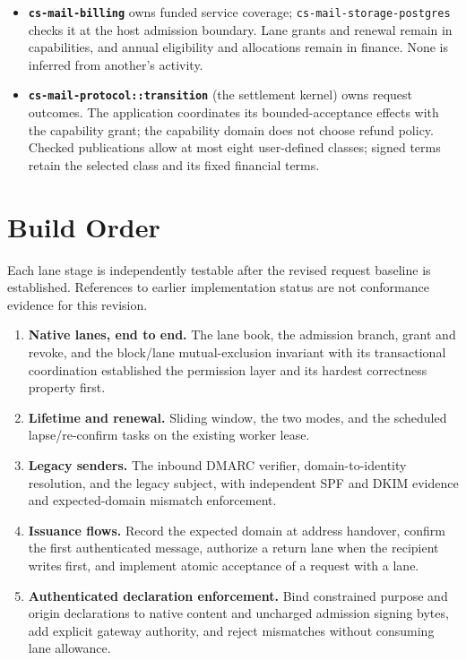 \documentclass[11pt]{article}
\begin{document}
\begin{itemize}[leftmargin=2em]
    domain-separated, versioned signing representations for grants and uncharged
    admission. Provider admission policy consumes envelope-visible facts only;
    recipient presentation policy remains in the client and has no settlement
    authority.
    \item \textbf{\texttt{cs-mail-billing}} owns funded service coverage;
    \texttt{cs-mail-storage-postgres} checks it at the host admission boundary.
    Lane grants and renewal remain in capabilities, and annual eligibility and
    allocations remain in finance. None is inferred from another's activity.
    \item \textbf{\texttt{cs-mail-protocol::transition}} (the settlement kernel)
    owns request outcomes. The application coordinates its bounded-acceptance
    effects with the capability grant; the capability domain does not choose
    refund policy. Checked publications allow at most eight user-defined classes;
    signed terms retain the selected class and its fixed financial terms.
\end{itemize}

\section{Build Order}

Each lane stage is independently testable after the revised request baseline
is established. References to earlier implementation status are not conformance
evidence for this revision.

\begin{enumerate}[leftmargin=2em]
    \item \textbf{Native lanes, end to end.} The lane book, the admission branch,
    grant and revoke, and the block/lane mutual-exclusion invariant with its
    transactional coordination established the permission layer and its hardest
    correctness property first.
    \item \textbf{Lifetime and renewal.} Sliding window, the two modes, and the
    scheduled lapse/re-confirm tasks on the existing worker lease.
    \item \textbf{Legacy senders.} The inbound DMARC verifier,
    domain-to-identity resolution, and the legacy subject, with independent SPF
    and DKIM evidence and expected-domain mismatch enforcement.
    \item \textbf{Issuance flows.} Record the expected domain at address handover, confirm the first
    authenticated message, authorize a return lane when the recipient writes first,
    and implement atomic acceptance of a request with a lane.
    \item \textbf{Authenticated declaration enforcement.} Bind constrained purpose and origin declarations to native
    content and uncharged admission signing bytes, add explicit gateway authority,
    and reject mismatches without consuming lane allowance.
\end{enumerate}
\end{document}
